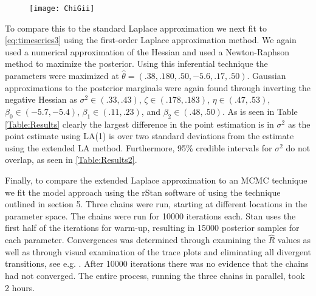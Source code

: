 \documentclass[11pt]{isuthesis}
\begin{document}
	
		\begin{figure}[!htp]
			\centering
			\texttt{[image: ChiGii]}
			\label{fig:ChiGii}
		\end{figure}
	
	To compare this to the standard Laplace approximation we next fit to \eqref{eq:timeseries3} using the first-order Laplace approximation method.   We again used a numerical approximation of the Hessian and used a Newton-Raphson method to maximize the posterior.  Using this inferential technique the parameters were maximized at $\hat{\theta}=(.38,.180,.50,-5.6,.17,.50)$.  Gaussian approximations to the posterior marginals were again found through inverting the negative Hessian as $\sigma^2 \in (.33,.43)$, $\zeta \in (.178,.183)$, $\eta \in (.47,.53)$, $\beta_0 \in (-5.7,-5.4)$, $\beta_1 \in (.11,.23)$, and $\beta_2 \in (.48,.50)$.  As is seen in Table \ref{Table:Results} clearly the largest difference in the point estimation is in $\sigma^2$ as the point estimate using LA(1) is over two standard deviations from the estimate using the extended LA method.  Furthermore, 95\% credible intervals for $\sigma^2$ do not overlap, as seen in \ref{Table:Results2}.
	
	Finally, to compare the extended Laplace approximation to an MCMC technique we fit the model approach using the rStan software of \cite{gelman2015stan} using the technique outlined in section 5.  Three chains were run, starting at different locations in the parameter space.  The chains were run for 10000 iterations each.  Stan uses the first half of the iterations for warm-up, resulting in 15000 posterior samples for each parameter.  Convergences was determined through examining the $\hat{R}$ values as well as through visual examination of the trace plots and eliminating all divergent transitions, see e.g. \cite{betancort}. After 10000 iterations there was no evidence that the chains had not converged.  The entire process, running the three chains in parallel, took 2 hours.  
	
\end{document}
